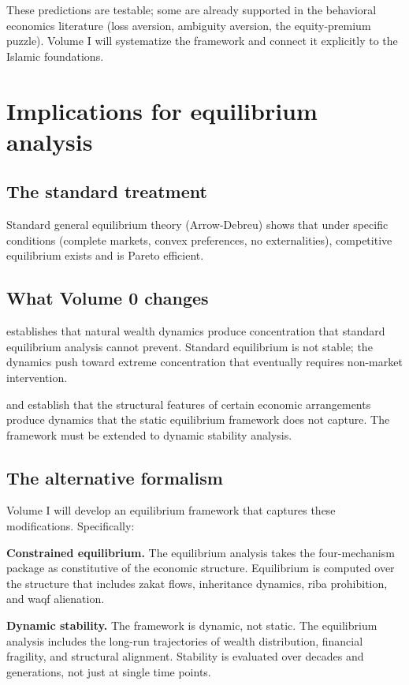 These predictions are testable; some are already supported in the
behavioral economics literature (loss aversion, ambiguity
aversion, the equity-premium puzzle). Volume I will systematize
the framework and connect it explicitly to the Islamic
foundations.

\section{Implications for equilibrium analysis}
\label{sec:to-vol1-equilibrium}

\subsection{The standard treatment}

Standard general equilibrium theory (Arrow-Debreu) shows that
under specific conditions (complete markets, convex preferences,
no externalities), competitive equilibrium exists and is Pareto
efficient.

\subsection{What Volume 0 changes}

 establishes that natural wealth dynamics
produce concentration that standard equilibrium analysis cannot
prevent. Standard equilibrium is not stable; the dynamics push
toward extreme concentration that eventually requires non-market
intervention.

 and  establish that
the structural features of certain economic arrangements produce
dynamics that the static equilibrium framework does not capture.
The framework must be extended to dynamic stability analysis.

\subsection{The alternative formalism}

Volume I will develop an equilibrium framework that captures
these modifications. Specifically:

\textbf{Constrained equilibrium.} The equilibrium analysis takes
the four-mechanism package as constitutive of the economic
structure. Equilibrium is computed over the structure that
includes zakat flows, inheritance dynamics, riba prohibition, and
waqf alienation.

\textbf{Dynamic stability.} The framework is dynamic, not static.
The equilibrium analysis includes the long-run trajectories of
wealth distribution, financial fragility, and structural
alignment. Stability is evaluated over decades and generations,
not just at single time points.

